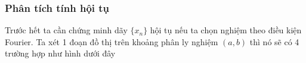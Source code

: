 
\subsubsection{Phân tích tính hội tụ}



% 



Trước hết ta cần chứng minh dãy $\{x_n\}$ hội tụ nếu ta chọn nghiệm theo điều kiện Fourier. Ta xét 1 đoạn đồ thị trên khoảng phân ly nghiệm $(a,b)$ thì nó sẽ có 4 trường hợp như hình dưới đây 

